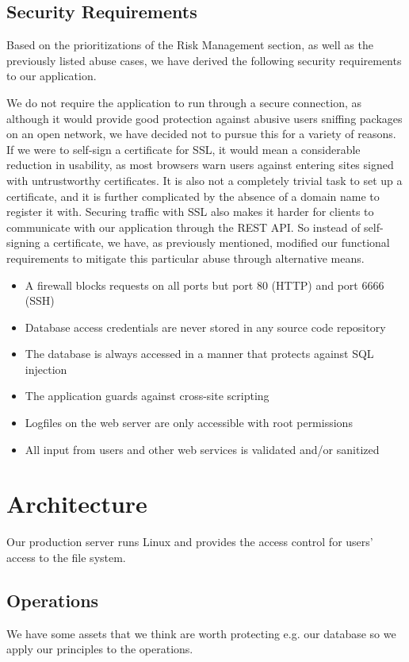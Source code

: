 \documentclass[a4paper]{article}
\begin{document}
\subsection{Security Requirements}
Based on the prioritizations of the Risk Management section, as well as the previously listed abuse cases, we have derived the following security requirements to our application.

We do not require the application to run through a secure connection, as although it would provide good protection against abusive users sniffing packages on an open network, we have decided not to pursue this for a variety of reasons. If we were to self-sign a certificate for SSL, it would mean a considerable reduction in usability, as most browsers warn users against entering sites signed with untrustworthy certificates. It is also not a completely trivial task to set up a certificate, and it is further complicated by the absence of a domain name to register it with. Securing traffic with SSL also makes it harder for clients to communicate with our application through the REST API. So instead of self-signing a certificate, we have, as previously mentioned, modified our functional requirements to mitigate this particular abuse through alternative means.
\begin{itemize}
\item A firewall blocks requests on all ports but port 80 (HTTP) and port 6666 (SSH)
\item Database access credentials are never stored in any source code repository
\item The database is always accessed in a manner that protects against SQL injection
\item The application guards against cross-site scripting
\item Logfiles on the web server are only accessible with root permissions
\item All input from users and other web services is validated and/or sanitized
\end{itemize}

\section{Architecture}

Our production server runs Linux and provides the access control for users' access to the file system.

\subsection{Operations}
We have some assets that we think are worth protecting e.g. our database so we apply our principles\cite{princ} to the operations.
\end{document}
